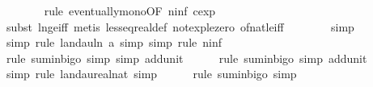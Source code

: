 \begin{isabellebody}
\ \ \ \ \ \ \isamarkupfalse%
\ {\isacharparenleft}{\kern0pt}rule\ eventually{\isacharunderscore}{\kern0pt}mono{\isacharbrackleft}{\kern0pt}OF\ n{\isacharunderscore}{\kern0pt}inf{\isacharbrackleft}{\kern0pt}\ c{\isacharequal}{\kern0pt}{\isachardoublequoteopen}exp\ {}{\isachardoublequoteclose}{\isacharbrackright}{\kern0pt}{\isacharbrackright}{\kern0pt}{\isacharparenright}{\kern0pt}\isanewline
\ \ \ \ \ \ \isamarkupfalse%
\ {\isacharparenleft}{\kern0pt}subst\ ln{\isacharunderscore}{\kern0pt}ge{\isacharunderscore}{\kern0pt}iff{\isacharcomma}{\kern0pt}\ metis\ less{\isacharunderscore}{\kern0pt}eq{\isacharunderscore}{\kern0pt}real{\isacharunderscore}{\kern0pt}def\ not{\isacharunderscore}{\kern0pt}exp{\isacharunderscore}{\kern0pt}le{\isacharunderscore}{\kern0pt}zero\ of{\isacharunderscore}{\kern0pt}nat{\isacharunderscore}{\kern0pt}{}{\isacharunderscore}{\kern0pt}le{\isacharunderscore}{\kern0pt}iff{\isacharparenright}{\kern0pt}\isanewline
\ \ \ \ \ \ \isamarkupfalse%
\ simp\isanewline
\ \ \ \ \ \isamarkupfalse%
\ {\isacharparenleft}{\kern0pt}simp{\isacharcomma}{\kern0pt}\ rule\ landau{\isacharunderscore}{\kern0pt}ln{\isacharunderscore}{\kern0pt}{}{\isacharbrackleft}{\kern0pt}\ a{\isacharequal}{\kern0pt}{\isachardoublequoteopen}{}{\isachardoublequoteclose}{\isacharbrackright}{\kern0pt}{\isacharcomma}{\kern0pt}\ simp{\isacharcomma}{\kern0pt}\ simp{\isacharcomma}{\kern0pt}\ rule\ n{\isacharunderscore}{\kern0pt}inf{\isacharparenright}{\kern0pt}\isanewline
\ \ \ \ \ \isamarkupfalse%
\ {\isacharparenleft}{\kern0pt}rule\ sum{\isacharunderscore}{\kern0pt}in{\isacharunderscore}{\kern0pt}bigo{\isacharcomma}{\kern0pt}\ simp{\isacharcomma}{\kern0pt}\ simp\ add{\isacharcolon}{\kern0pt}unit{\isacharunderscore}{\kern0pt}{}{\isacharparenright}{\kern0pt}\isanewline
\ \ \ \ \isamarkupfalse%
\ {\isacharparenleft}{\kern0pt}rule\ sum{\isacharunderscore}{\kern0pt}in{\isacharunderscore}{\kern0pt}bigo{\isacharcomma}{\kern0pt}\ simp\ add{\isacharcolon}{\kern0pt}unit{\isacharunderscore}{\kern0pt}{}{\isacharparenright}{\kern0pt}\isanewline
\ \ \ \ \isamarkupfalse%
\ {\isacharparenleft}{\kern0pt}simp{\isacharcomma}{\kern0pt}\ rule\ landau{\isacharunderscore}{\kern0pt}real{\isacharunderscore}{\kern0pt}nat{\isacharcomma}{\kern0pt}\ simp{\isacharparenright}{\kern0pt}\isanewline
\ \ \ \ \isamarkupfalse%
\ {\isacharparenleft}{\kern0pt}rule\ sum{\isacharunderscore}{\kern0pt}in{\isacharunderscore}{\kern0pt}bigo{\isacharcomma}{\kern0pt}\ simp{\isacharparenright}{\kern0pt}\isanewline

\end{isabellebody}
